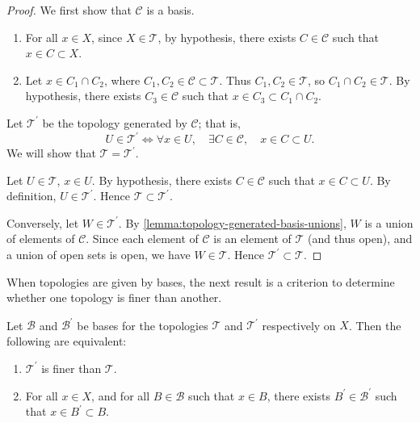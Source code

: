 \begin{proof}
We first show that $\mathcal{C}$ is a basis.
\begin{enumerate}[label=(\roman*)]
\item For all $x\in X$, since $X\in\mathcal{T}$, by hypothesis, there exists $C\in\mathcal{C}$ such that $x\in C\subset X$.
\item Let $x\in C_1\cap C_2$, where $C_1,C_2\in\mathcal{C}\subset\mathcal{T}$. Thus $C_1,C_2\in\mathcal{T}$, so $C_1\cap C_2\in\mathcal{T}$. By hypothesis, there exists $C_3\in\mathcal{C}$ such that $x\in C_3\subset C_1\cap C_2$.
\end{enumerate}

Let $\mathcal{T}^\prime$ be the topology generated by $\mathcal{C}$; that is,
\[U\in\mathcal{T}^\prime\iff\forall x\in U,\quad\exists C\in\mathcal{C},\quad x\in C\subset U.\]
We will show that $\mathcal{T}=\mathcal{T}^\prime$.

\fbox{$\subset$} Let $U\in\mathcal{T}$, $x\in U$. By hypothesis, there exists $C\in\mathcal{C}$ such that $x\in C\subset U$. By definition, $U\in\mathcal{T}^\prime$. Hence $\mathcal{T}\subset\mathcal{T}^\prime$.

\fbox{$\supset$} Conversely, let $W\in\mathcal{T}^\prime$. By \ref{lemma:topology-generated-basis-unions}, $W$ is a union of elements of $\mathcal{C}$. Since each element of $\mathcal{C}$ is an element of $\mathcal{T}$ (and thus open), and a union of open sets is open, we have $W\in\mathcal{T}$. Hence $\mathcal{T}^\prime\subset\mathcal{T}$.
\end{proof}

When topologies are given by bases, the next result is a criterion to determine whether one topology is finer than another.

\begin{lemma}\label{lemma:topology-finer-criterion}
Let $\mathcal{B}$ and $\mathcal{B}^\prime$ be bases for the topologies $\mathcal{T}$ and $\mathcal{T}^\prime$ respectively on $X$. Then the following are equivalent:
\begin{enumerate}[label=(\roman*)]
\item $\mathcal{T}^\prime$ is finer than $\mathcal{T}$.
\item For all $x\in X$, and for all $B\in\mathcal{B}$ such that $x\in B$, there exists $B^\prime\in\mathcal{B}^\prime$ such that $x\in B^\prime\subset B$.
\end{enumerate}
\end{lemma}

